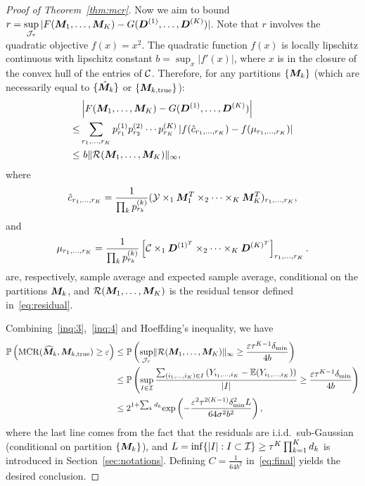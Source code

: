 \documentclass{article}
\DeclareMathOperator*{\mcr}{MCR}
\begin{document}
\begin{appendices}
\begin{proof}[Proof of Theorem~\ref{thm:mcr}]
Now we aim to bound $r=\displaystyle\sup_{\mathcal{J}_\tau} |F(\bm M_1,\ldots,\bm M_K)-G(\bm{D}^{(1)},\ldots,\bm{D}^{(K)})|$. Note that $r$ involves the quadratic objective $f(x)=x^2$. The quadratic function $f(x)$ is locally lipschitz continuous with lipschitz constant $b = \sup_x|f'(x)|$, where $x$ is in the closure of the convex hull of the entries of $\mathcal{C}$. Therefore, for any partitions $\{\bm M_k\}$ (which are necessarily equal to $\{\hat {\bm M}_k\}$ or $\{\bm M_{k,\text{true}}\}$):
\begin{align}\label{inq:4}
&\left|F(\bm M_1,\ldots,\bm M_K)-G(\bm{D}^{(1)}, \ldots,\bm{D}^{(K)})\right|\notag \\
\leq&\sum_{r_1,\ldots,r_K}p_{r_1}^{(1)}p_{r_2}^{(2)}\cdots p_{r_K}^{(K)}\left|f(\hat c_{r_1,\ldots,r_K})-f(\mu_{r_1,\ldots,r_K})\right|\notag \\
\leq& \ b\lVert\mathcal{R}(\bm M_1,\ldots,\bm M_K)\rVert_\infty,
\end{align}
where 
\[
\hat c_{r_1,\ldots,r_K}={1\over \prod_k p^{(k)}_{r_k}}  (\mathcal{Y}\times_1 \bm M^T_1\times_2\cdots\times_K\bm M^T_K)_{r_1,\ldots,r_K},
\]
and
\[
\mu_{r_1,\ldots,r_K}={1\over \prod_k  p^{(k)}_{r_k}}\left[ \mathcal{C}\times_1 \bm{D}^{(1)^T} \times_2\cdots\times_K \bm{D}^{(K)^T}\right]_{r_1,\ldots,r_K}.
\]
are, respectively, sample average and expected sample average, conditional on the partitions ${\bm M_k}$, and $\mathcal{R}( \bm M_1,\ldots,\bm M_K)$ is the residual tensor defined in~\eqref{eq:residual}. 

Combining~\eqref{inq:3},~\eqref{inq:4} and Hoeffding's inequality, we have
\begin{align}\label{eq:final}
\mathbb{P}\left(\mcr(\widehat{\mM}_k, \mM_{k,\text{true}}) \geq \varepsilon\right)
&\leq \mathbb{P}\left(\sup_{\tJ_\tau}\mnormSize{}{\tR(\mM_1,\ldots,\mM_K)} \geq {\varepsilon \tau^{K-1}\delta_{\min} \over 4 b}\right)\notag\notag \\
&\leq \mathbb{P}\left(  \sup_{I\in\tI} {\sum_{(i_1,\ldots,i_K)\in I}\left(Y_{i_1,\ldots,i_K}-\mathbb{E}(Y_{i_1,\ldots,i_K})\right)\over |I|}\geq   {\varepsilon \tau^{K-1}\delta_{\min} \over 4 b} \right)\notag \\
&\leq 2^{1+\sum_k d_k}\text{exp}\left( -\frac{\varepsilon^2\tau^{2(K-1)}\delta_{\min}^2L}{64\sigma^2b^2} \right),
\end{align}
where the last line comes from the fact that the residuals are i.i.d.\ sub-Gaussian (conditional on partition $\{\bm M_k\}$), and $L=\inf\{|I|: I\subset \mathcal{I}\} \geq \tau^K\prod_{k=1}^Kd_k$ is introduced in Section~\ref{sec:notations}.
Defining $C=\frac{1}{64b^2}$ in~\eqref{eq:final} yields the desired conclusion.



\end{proof}
\end{appendices}
\end{document}

